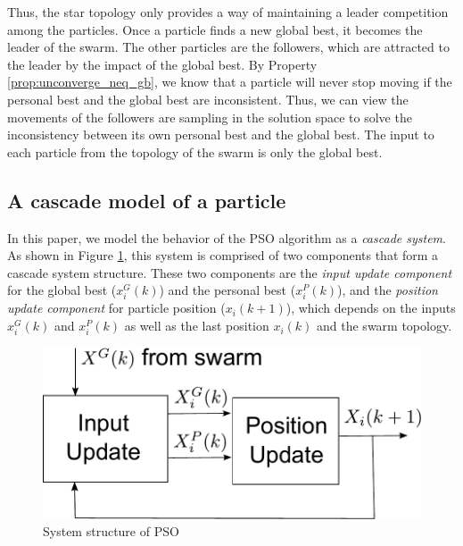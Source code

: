 Thus, the star topology only provides a way of maintaining a leader competition among the particles.
Once a particle finds a new global best, it becomes the leader of the swarm.
The other particles are the followers, which are attracted to the leader by the impact of the global best.
By Property \ref{prop:unconverge_neq_gb}, we know that a particle will never stop moving if the personal best and the global best are inconsistent.
Thus, we can view the movements of the followers are sampling in the solution space to solve the inconsistency between its own personal best and the global best.
The input to each particle from the topology of the swarm is only the global best.

\subsection{A cascade model of a particle}

In this paper, we model the behavior of the PSO algorithm as a \emph{cascade system}.
As shown in Figure \ref{fig:sys_flow}, this system is comprised of two components that form a cascade system structure.
These two components are the 
\emph{input update component} for the global best ($ x^{G}_{i}(k) $) and the personal best ($ x^{P}_{i}(k) $), and the 
\emph{position update component} for particle position ($ x_{i}(k+1) $), which depends on the inputs $ x^{G}_{i}(k) $ and $ x^{P}_{i}(k) $ as well as the last position $ x_{i}(k) $ and the swarm topology.

\begin{figure}
\centering
\includegraphics[width=0.7\linewidth]{./fig/sys_flow.pdf}
\caption{System structure of PSO}
\label{fig:sys_flow}
\end{figure}

